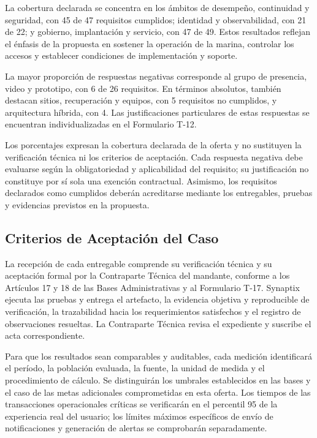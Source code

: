 La cobertura declarada se concentra en los ámbitos de desempeño,
continuidad y seguridad, con 45 de 47 requisitos cumplidos; identidad
y observabilidad, con 21 de 22; y gobierno, implantación y servicio,
con 47 de 49. Estos resultados reflejan el énfasis de la propuesta
en sostener la operación de la marina, controlar los accesos y
establecer condiciones de implementación y soporte.

La mayor proporción de respuestas negativas corresponde al grupo
de presencia, video y prototipo, con 6 de 26 requisitos. En términos
absolutos, también destacan sitios, recuperación y equipos, con
5 requisitos no cumplidos, y arquitectura híbrida, con 4. Las
justificaciones particulares de estas respuestas se encuentran
individualizadas en el Formulario T-12.

Los porcentajes expresan la cobertura declarada de la oferta y
no sustituyen la verificación técnica ni los criterios de aceptación.
Cada respuesta negativa debe evaluarse según la obligatoriedad
y aplicabilidad del requisito; su justificación no constituye por
sí sola una exención contractual. Asimismo, los requisitos declarados
como cumplidos deberán acreditarse mediante los entregables,
pruebas y evidencias previstos en la propuesta.

\subsection{Criterios de Aceptación del Caso}

La recepción de cada entregable comprende su verificación técnica y su aceptación formal por la Contraparte Técnica del mandante, conforme a los Artículos 17 y 18 de las Bases Administrativas y al Formulario T-17. Synaptix ejecuta las pruebas y entrega el artefacto, la evidencia objetiva y reproducible de verificación, la trazabilidad hacia los requerimientos satisfechos y el registro de observaciones resueltas. La Contraparte Técnica revisa el expediente y suscribe el acta correspondiente.

Para que los resultados sean comparables y auditables, cada medición identificará el período, la población evaluada, la fuente, la unidad de medida y el procedimiento de cálculo. Se distinguirán los umbrales establecidos en las bases y el caso de las metas adicionales comprometidas en esta oferta. Los tiempos de las transacciones operacionales críticas se verificarán en el percentil 95 de la experiencia real del usuario; los límites máximos específicos de envío de notificaciones y generación de alertas se comprobarán separadamente.

